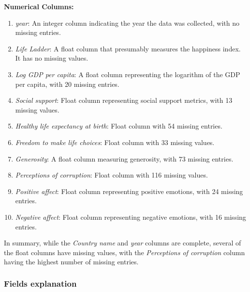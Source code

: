             \textbf{Numerical Columns:}
            \begin{enumerate}
                \item \textit{year}: An integer column indicating the year the data was collected, with no missing entries.
                \item \textit{Life Ladder}: A float column that presumably measures the happiness index. It has no missing values.
                \item \textit{Log GDP per capita}: A float column representing the logarithm of the GDP per capita, with 20 missing entries.
                \item \textit{Social support}: Float column representing social support metrics, with 13 missing values.
                \item \textit{Healthy life expectancy at birth}: Float column with 54 missing entries.
                \item \textit{Freedom to make life choices}: Float column with 33 missing values.
                \item \textit{Generosity}: A float column measuring generosity, with 73 missing entries.
                \item \textit{Perceptions of corruption}: Float column with 116 missing values.
                \item \textit{Positive affect}: Float column representing positive emotions, with 24 missing entries.
                \item \textit{Negative affect}: Float column representing negative emotions, with 16 missing entries.
            \end{enumerate}

            In summary, while the \textit{Country name} and \textit{year} columns are complete, several of the float columns have missing values, with the \textit{Perceptions of corruption} column having the highest number of missing entries.

            \subsubsection{Fields explanation}

